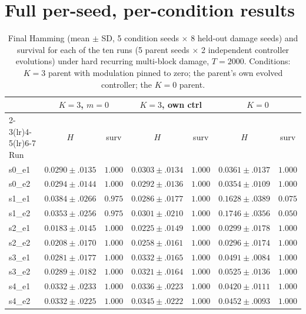 \documentclass{article}
\begin{document}
\appendix
\setcounter{table}{0}\setcounter{figure}{0}
\renewcommand{\thetable}{A\arabic{table}}
\renewcommand{\thefigure}{A\arabic{figure}}

\section{Full per-seed, per-condition results}
\label{app:rawtables}

\begin{table}[h]
\centering
\small
\caption{Final Hamming (mean $\pm$ SD, 5 condition seeds $\times$ 8
held-out damage seeds) and survival for each of the ten runs (5 parent
seeds $\times$ 2 independent controller evolutions) under hard recurring
multi-block damage, $T{=}2000$. Conditions: $K{=}3$ parent with
modulation pinned to zero; the parent's own evolved controller; the
$K{=}0$ parent.}
\label{tab:attribution}
\footnotesize
\setlength{\tabcolsep}{4pt}
\begin{tabular}{lcccccc}
\toprule
& \multicolumn{2}{c}{$K{=}3$, $m{=}0$} & \multicolumn{2}{c}{$K{=}3$, own ctrl} & \multicolumn{2}{c}{$K{=}0$} \\
\cmidrule(lr){2-3}\cmidrule(lr){4-5}\cmidrule(lr){6-7}
Run & $H$ & surv & $H$ & surv & $H$ & surv \\
\midrule
s0\_e1 & $0.0290{\pm}.0135$ & $1.000$ & $0.0303{\pm}.0134$ & $1.000$ & $0.0361{\pm}.0137$ & $1.000$ \\
s0\_e2 & $0.0294{\pm}.0144$ & $1.000$ & $0.0292{\pm}.0136$ & $1.000$ & $0.0354{\pm}.0109$ & $1.000$ \\
s1\_e1 & $0.0384{\pm}.0266$ & $0.975$ & $0.0286{\pm}.0177$ & $1.000$ & $0.1628{\pm}.0389$ & $0.075$ \\
s1\_e2 & $0.0353{\pm}.0256$ & $0.975$ & $0.0301{\pm}.0210$ & $1.000$ & $0.1746{\pm}.0356$ & $0.050$ \\
s2\_e1 & $0.0183{\pm}.0145$ & $1.000$ & $0.0225{\pm}.0149$ & $1.000$ & $0.0299{\pm}.0178$ & $1.000$ \\
s2\_e2 & $0.0208{\pm}.0170$ & $1.000$ & $0.0258{\pm}.0161$ & $1.000$ & $0.0296{\pm}.0174$ & $1.000$ \\
s3\_e1 & $0.0281{\pm}.0177$ & $1.000$ & $0.0332{\pm}.0165$ & $1.000$ & $0.0491{\pm}.0084$ & $1.000$ \\
s3\_e2 & $0.0289{\pm}.0182$ & $1.000$ & $0.0321{\pm}.0164$ & $1.000$ & $0.0525{\pm}.0136$ & $1.000$ \\
s4\_e1 & $0.0332{\pm}.0233$ & $1.000$ & $0.0336{\pm}.0223$ & $1.000$ & $0.0420{\pm}.0111$ & $1.000$ \\
s4\_e2 & $0.0332{\pm}.0225$ & $1.000$ & $0.0345{\pm}.0222$ & $1.000$ & $0.0452{\pm}.0093$ & $1.000$ \\
\bottomrule
\end{tabular}
\end{table}
\end{document}
